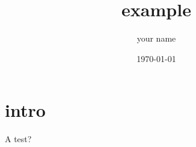 \documentclass{article}
\title{example}
\author{your name}
\date{\today}
\begin{document}
\maketitle

\section{intro}
A test?
\end{document}
